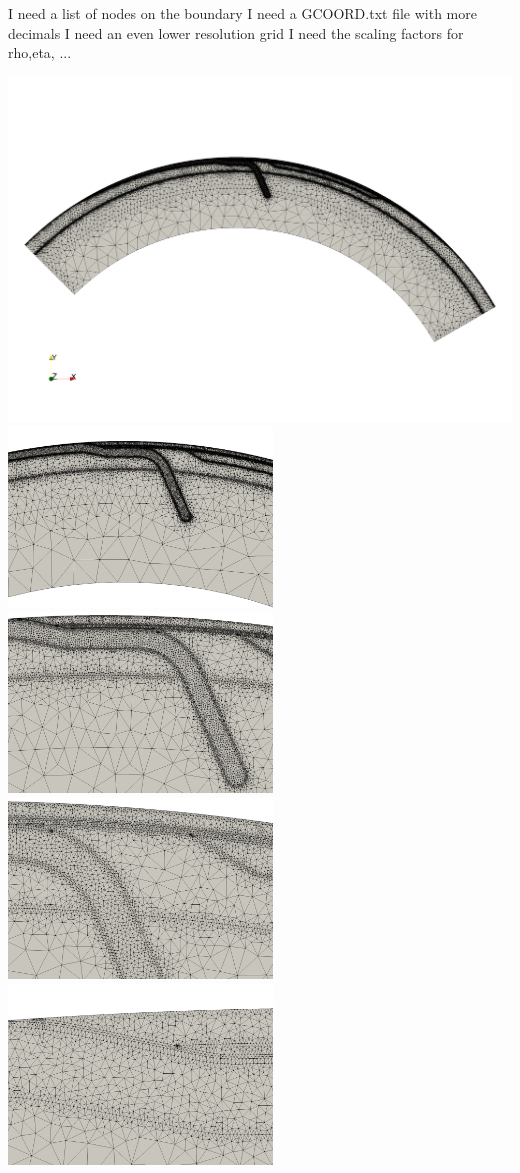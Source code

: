 I need a list of nodes on the boundary
I need a GCOORD.txt file with more decimals
I need an even lower resolution  grid
I need the scaling factors for rho,eta, ...


\includegraphics[width=14cm]{python_codes/fieldstone_44/grid_lowres1}\\
\includegraphics[width=7cm]{python_codes/fieldstone_44/grid_lowres2}
\includegraphics[width=7cm]{python_codes/fieldstone_44/grid_lowres3}\\
\includegraphics[width=7cm]{python_codes/fieldstone_44/grid_lowres4}
\includegraphics[width=7cm]{python_codes/fieldstone_44/grid_lowres5}


